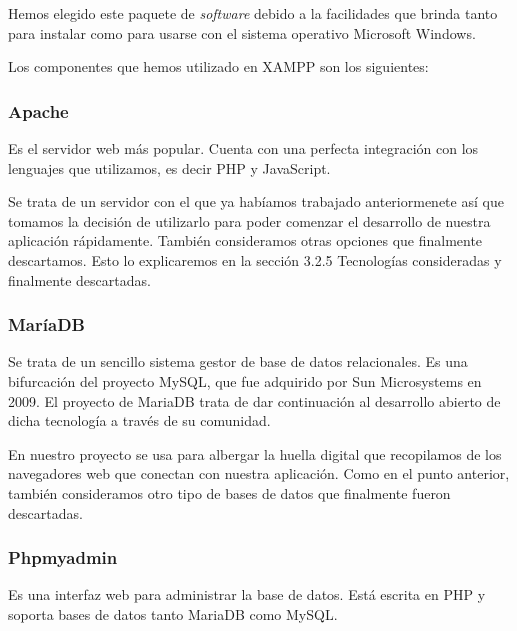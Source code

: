 Hemos elegido este paquete de \textit{software} debido a la facilidades que brinda tanto para instalar como para usarse con el sistema operativo Microsoft Windows. \par 

Los componentes que hemos utilizado en XAMPP son los siguientes: \par

\subsubsection{Apache}

Es el servidor web más popular. Cuenta con una perfecta integración con los lenguajes que utilizamos, es decir PHP y JavaScript. \par 

Se trata de un servidor con el que ya habíamos trabajado anteriormenete así que tomamos la decisión de utilizarlo para poder comenzar el desarrollo de nuestra aplicación rápidamente. También consideramos otras opciones que finalmente descartamos. Esto lo explicaremos en la sección 3.2.5 Tecnologías consideradas y finalmente descartadas. \par 

\subsubsection{MaríaDB}

Se trata de un sencillo sistema gestor de base de datos relacionales. Es una bifurcación del proyecto MySQL, que fue adquirido por Sun Microsystems en 2009. El proyecto de MariaDB trata de dar continuación al desarrollo abierto de dicha tecnología a través de su comunidad. \par 

En nuestro proyecto se usa para albergar la huella digital que recopilamos de los navegadores web que conectan con nuestra aplicación. Como en el punto anterior, también consideramos otro tipo de bases de datos que finalmente fueron descartadas. \par 

\subsubsection{Phpmyadmin}

Es una interfaz web para administrar la base de datos. Está escrita en PHP y soporta bases de datos tanto MariaDB como MySQL. \par 

